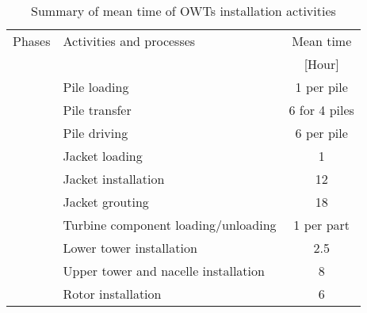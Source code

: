 
\begin{table}
\label{tab:times}

\begin{tabular}{llc}
\hline 
Phases & Activities and processes & Mean time \\ 
& & [Hour] \\ 
\hline 
 & Pile loading & 1 per pile \\
 & Pile transfer & 6 for 4 piles\\
 & Pile driving & 6 per pile\\
 & Jacket loading & 1\\
 & Jacket installation & 12\\
 & Jacket grouting & 18\\
 & Turbine component loading/unloading & 1 per part\\
 & Lower tower installation & 2.5\\
 & Upper tower and nacelle installation & 8\\
 & Rotor installation & 6\\
\hline 
\end{tabular} 

\caption{Summary of mean time of OWTs installation activities}
\end{table}
